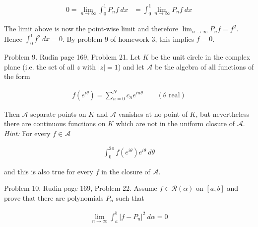 \documentclass{article}
\begin{document}
\begin{align*}
  0=\lim_{n\to \infty}\int_0^1 P_nf \ dx &= \int_0^1 \lim_{n\to \infty}P_nf \ dx 
\end{align*}

The limit above is now the point-wise limit and therefore $\lim_{n\to \infty}P_nf = f^2$.  Hence $\int_0^1 f^2\ dx = 0$.  By problem 9 of homework 3, this implies $f=0$.  

 \pagebreak
 {\Large \color{Sepia} Problem 9. Rudin page 169, Problem 21. Let $K$ be the unit circle in the complex plane (i.e. the set of all $z$ with $|z|=1$) and let $\mathcal A$ be the algebra of all functions of the form 
 
 \begin{align*}
    f(e^{i\theta})=\sum_{n=0}^N c_n e^{in\theta} \qquad (\theta \text{ real})
 \end{align*}
 
 Then $\mathscr A$ separate points on $K$ and $\mathscr A$ vanishes at no point of $K$, but nevertheless there are continuous functions on $K$ which are not in the uniform closure of $\mathscr A$.  {\it Hint:} For every $f\in\mathscr A$ 

 \begin{align*}
   \int_0^{2\pi} f(e^{i\theta})e^{i\theta}\ d\theta
 \end{align*}

 and this is also true for every $f$ in the closure of $\mathscr A$.
 
 }

 \vspace{1cm} 


  \pagebreak
  {\Large \color{Sepia} Problem 10. Rudin page 169, Problem 22. Assume $f\in\mathscr R(\alpha)$ on $[a,b]$ and prove that there are polynomials $P_n$ such that 
  
  \begin{align*}
    \lim_{n\to \infty}\int_a^b |f-P_n|^2 \ d\alpha = 0
  \end{align*}
  
  }

  \vspace{1cm} 


   \pagebreak
\end{document}
